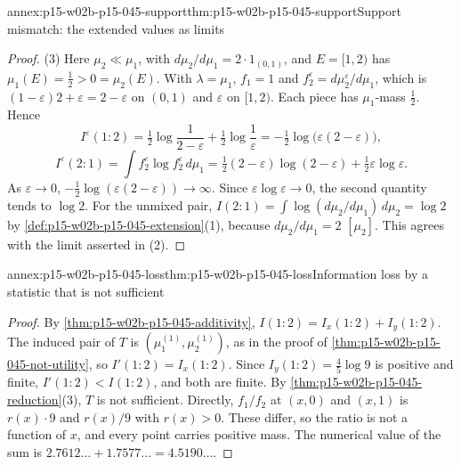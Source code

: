 \begin{annexitem}{annex:p15-w02b-p15-045-support}{thm:p15-w02b-p15-045-support}{Support mismatch: the extended values as limits}
\begin{proof}
(3) Here \(\mu_2\ll\mu_1\), with \(d\mu_2/d\mu_1=2\cdot1_{(0,1)}\), and
\(E=[1,2)\) has \(\mu_1(E)=\tfrac12>0=\mu_2(E)\). With \(\lambda=\mu_1\),
\(f_1=1\) and \(f_2^\varepsilon=d\mu_2^\varepsilon/d\mu_1\), which is
\((1-\varepsilon)2+\varepsilon=2-\varepsilon\) on \((0,1)\) and
\(\varepsilon\) on \([1,2)\). Each piece has \(\mu_1\)-mass \(\tfrac12\).
Hence
\[
  I^\varepsilon(1:2)=\tfrac12\log\frac1{2-\varepsilon}+\tfrac12\log\frac1\varepsilon
                   =-\tfrac12\log\bigl(\varepsilon(2-\varepsilon)\bigr),
\]
\[
  I^\varepsilon(2:1)=\int f_2^\varepsilon\log f_2^\varepsilon\,d\mu_1
   =\tfrac12(2-\varepsilon)\log(2-\varepsilon)+\tfrac12\varepsilon\log\varepsilon .
\]
As \(\varepsilon\to0\), \(-\tfrac12\log(\varepsilon(2-\varepsilon))\to\infty\).
Since \(\varepsilon\log\varepsilon\to0\), the second quantity tends to
\(\log2\). For the unmixed pair,
\(I(2:1)=\int\log(d\mu_2/d\mu_1)\,d\mu_2=\log2\) by
\cref{def:p15-w02b-p15-045-extension}(1), because
\(d\mu_2/d\mu_1=2\) \([\mu_2]\). This agrees with the limit asserted
in (2).
\end{proof}
\end{annexitem}

\begin{annexitem}{annex:p15-w02b-p15-045-loss}{thm:p15-w02b-p15-045-loss}{Information loss by a statistic that is not sufficient}
\begin{proof}
By \cref{thm:p15-w02b-p15-045-additivity},
\(I(1:2)=I_x(1:2)+I_y(1:2)\). The induced pair of \(T\) is
\((\mu_1^{(1)},\mu_2^{(1)})\), as in the proof of
\cref{thm:p15-w02b-p15-045-not-utility}, so \(I'(1:2)=I_x(1:2)\). Since
\(I_y(1:2)=\tfrac45\log9\) is positive and finite, \(I'(1:2)<I(1:2)\),
and both are finite. By \cref{thm:p15-w02b-p15-045-reduction}(3), \(T\)
is not sufficient. Directly, \(f_1/f_2\) at \((x,0)\) and \((x,1)\) is
\(r(x)\cdot9\) and \(r(x)/9\) with \(r(x)>0\). These differ, so the ratio
is not a function of \(x\), and every point carries positive mass. The
numerical value of the sum is \(2.7612\ldots+1.7577\ldots=4.5190\ldots\).
\end{proof}
\end{annexitem}

